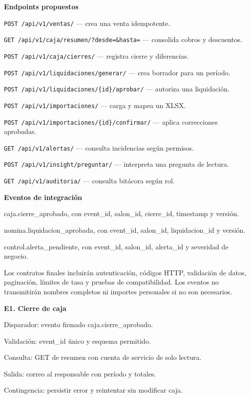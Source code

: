 
\textbf{Endpoints propuestos}


\begin{vinetas}
\item \texttt{POST /api/v1/ventas/} — crea una venta idempotente.
\item \texttt{GET /api/v1/caja/resumen/?desde=\&hasta=} — consolida cobros y descuentos.
\item \texttt{POST /api/v1/caja/cierres/} — registra cierre y diferencias.
\item \texttt{POST /api/v1/liquidaciones/generar/} — crea borrador para un período.
\item \texttt{POST /api/v1/liquidaciones/\{id\}/aprobar/} — autoriza una liquidación.
\item \texttt{POST /api/v1/importaciones/} — carga y mapea un XLSX.
\item \texttt{POST /api/v1/importaciones/\{id\}/confirmar/} — aplica correcciones aprobadas.
\item \texttt{GET /api/v1/alertas/} — consulta incidencias según permisos.
\item \texttt{POST /api/v1/insight/preguntar/} — interpreta una pregunta de lectura.
\item \texttt{GET /api/v1/auditoria/} — consulta bitácora según rol.
\end{vinetas}

\textbf{Eventos de integración}


\begin{vinetas}
\item caja.cierre\_aprobado, con event\_id, salon\_id, cierre\_id, timestamp y versión.
\item nomina.liquidacion\_aprobada, con event\_id, salon\_id, liquidacion\_id y versión.
\item control.alerta\_pendiente, con event\_id, salon\_id, alerta\_id y severidad de negocio.
\end{vinetas}

Los contratos finales incluirán autenticación, códigos HTTP, validación de datos, paginación, límites de tasa y pruebas de compatibilidad. Los eventos no transmitirán nombres completos ni importes personales si no son necesarios.



\textbf{E1. Cierre de caja}


\begin{vinetas}
\item Disparador: evento firmado caja.cierre\_aprobado.
\item Validación: event\_id único y esquema permitido.
\item Consulta: GET de resumen con cuenta de servicio de solo lectura.
\item Salida: correo al responsable con período y totales.
\item Contingencia: persistir error y reintentar sin modificar caja.
\end{vinetas}

